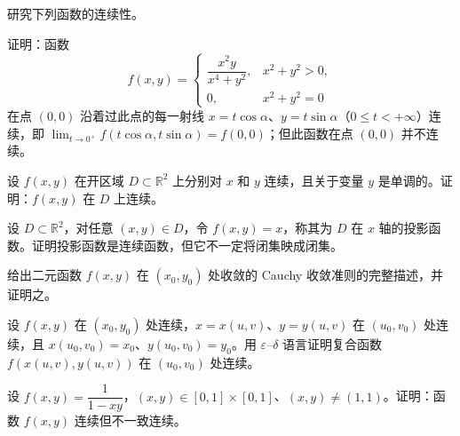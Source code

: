 \newpage
\noindent\begin{minipage}{\textwidth}
研究下列函数的连续性。
\end{minipage}\par\vfill
\noindent\begin{minipage}{\textwidth}
证明：函数 \[f(x,y)=\begin{cases}\dfrac{x^2y}{x^4+y^2},&x^2+y^2>0,\\0,&x^2+y^2=0\end{cases}\] 在点 $(0,0)$ 沿着过此点的每一射线 $x=t\cos\alpha$、$y=t\sin\alpha$（$0\le t<+\infty$）连续，即 $\lim_{t\to0^+}f(t\cos\alpha,t\sin\alpha)=f(0,0)$；但此函数在点 $(0,0)$ 并不连续。
\end{minipage}\par\vfill
\noindent\begin{minipage}{\textwidth}
设 $f(x,y)$ 在开区域 $D\subset\mathbb R^2$ 上分别对 $x$ 和 $y$ 连续，且关于变量 $y$ 是单调的。证明：$f(x,y)$ 在 $D$ 上连续。
\end{minipage}\par\vfill
\noindent\begin{minipage}{\textwidth}
设 $D\subset\mathbb R^2$，对任意 $(x,y)\in D$，令 $f(x,y)=x$，称其为 $D$ 在 $x$ 轴的投影函数。证明投影函数是连续函数，但它不一定将闭集映成闭集。
\end{minipage}\par\vfill
\newpage
\noindent\begin{minipage}{\textwidth}
给出二元函数 $f(x,y)$ 在 $(x_0,y_0)$ 处收敛的 Cauchy 收敛准则的完整描述，并证明之。
\end{minipage}\par\vfill
\noindent\begin{minipage}{\textwidth}
设 $f(x,y)$ 在 $(x_0,y_0)$ 处连续，$x=x(u,v)$、$y=y(u,v)$ 在 $(u_0,v_0)$ 处连续，且 $x(u_0,v_0)=x_0$、$y(u_0,v_0)=y_0$。用 $\varepsilon$--$\delta$ 语言证明复合函数 $f(x(u,v),y(u,v))$ 在 $(u_0,v_0)$ 处连续。
\end{minipage}\par\vfill
\noindent\begin{minipage}{\textwidth}
设 $f(x,y)=\dfrac1{1-xy}$，$(x,y)\in[0,1]\times[0,1]$、$(x,y)\ne(1,1)$。证明：函数 $f(x,y)$ 连续但不一致连续。
\end{minipage}\par\vfill
